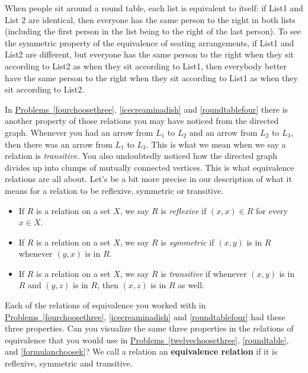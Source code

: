 \documentclass[10pt,]{book}
\newcommand{\terminology}[1]{\textbf{#1}}
\theoremstyle{plain}
\theoremstyle{definition}
\theoremstyle{definition}
\numberwithin{equation}{chapter}
\begin{document}
\par
When people sit around a round table, each list is equivalent to itself: if List1 and List 2 are identical, then everyone has the same person to the right in both lists (including the first person in the list being to the right of the last person). To see the symmetric property of the equivalence of seating arrangements, if List1 and List2 are different, but everyone has the same person to the right when they sit according to List2 as when they sit according to List1, then everybody better have the same person to the right when they sit according to List1 as when they sit according to List2.%
\par
In \hyperref[fourchoosethree]{Problems~\ref{fourchoosethree}}, \hyperref[icecreaminadish]{\ref{icecreaminadish}} and \hyperref[roundtablefour]{\ref{roundtablefour}} there is another property of those relations you may have noticed from the directed graph. Whenever you had an arrow from \(L_1\) to \(L_2\) and an arrow from \(L_2\) to \(L_3\), then there was an arrow from \(L_1\) to \(L_3\). This is what we mean when we say a relation is \emph{transitive}. You also undoubtedly noticed how the directed graph divides up into clumps of mutually connected vertices. This is what equivalence relations are all about. Let's be a bit more precise in our description of what it means for a relation to be reflexive, symmetric or transitive. \leavevmode%
\begin{itemize}[label=\textbullet]
\item{}If \(R\) is a relation on a set \(X\), we say \(R\) is \emph{reflexive}  if \((x,x)\in
R\) for every \(x\in X\).%
\item{}If \(R\) is a relation on a set \(X\), we say \(R\) is \emph{symmetric} if \((x,y)\) is in \(R\) whenever \((y,x)\) is in \(R\).%
\item{}If \(R\) is a relation on a set \(X\), we say \(R\) is \emph{transitive} if whenever \((x,y)\) is in \(R\) and \((y,z)\) is in \(R\), then \((x,z)\) is in \(R\) as well.%
\end{itemize}
%
\par
Each of the relations of equivalence you worked with in \hyperref[fourchoosethree]{Problems~\ref{fourchoosethree}}, \hyperref[icecreaminadish]{\ref{icecreaminadish}} and \hyperref[roundtablefour]{\ref{roundtablefour}} had these three properties. Can you visualize the same three properties in the relations of equivalence that you would use in \hyperref[twelvechoosethree]{Problems~\ref{twelvechoosethree}}, \hyperref[roundtable]{\ref{roundtable}}, and \hyperref[formulanchoosek]{\ref{formulanchoosek}}? We call a relation an \terminology{equivalence relation} if it is reflexive, symmetric and transitive.%
\end{document}
